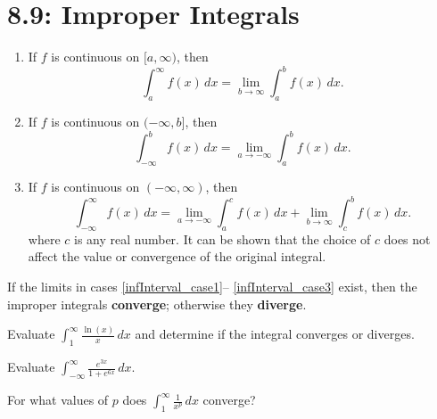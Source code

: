 \documentclass[../mathNotesPreamble]{subfiles}
\begin{document}
  \section{8.9: Improper Integrals}
    \begin{defn*}
      \begin{enumerate}
        \item \label{infInterval_case1} If $f$ is continuous on $[a,\infty)$, then
          \[\int_a^\infty f(x)\,dx=\lim_{b\to \infty} \int_a^b f(x)\,dx.\]
        \item \label{infInterval_case2} If $f$ is continuous on $(-\infty,b]$, then
          \[\int_{-\infty}^b f(x)\,dx=\lim_{a\to -\infty} \int_a^b f(x)\,dx.\]
        \item \label{infInterval_case3} If $f$ is continuous on $(-\infty,\infty)$, then
          \[\int_{-\infty}^\infty f(x)\,dx=\lim_{a\to-\infty}\int_a^c f(x)\,dx+\lim_{b\to\infty}\int_c^b f(x)\,dx.\]
          where $c$ is any real number. It can be shown that the choice of $c$ does not affect the value or convergence of the original integral.
      \end{enumerate}
      If the limits in cases \ref{infInterval_case1}-- \ref{infInterval_case3} exist, then the improper integrals \textbf{converge}; otherwise they \textbf{diverge}.
    \end{defn*}

    \begin{ex*}
      Evaluate $\displaystyle \int_1^\infty \frac{\ln(x)}{x}\,dx$ and determine if the integral converges or diverges.
    \end{ex*}
    \pagebreak

    \begin{ex*}
      Evaluate $\displaystyle \int_{-\infty}^{\infty} \frac{e^{3x}}{1+e^{6x}}\,dx$.
    \end{ex*}
    \pagebreak

    \begin{ex*}
      For what values of $p$ does $\displaystyle \int_1^\infty \frac{1}{x^p}\,dx$ converge?
    \end{ex*}
    \pagebreak
\end{document}
